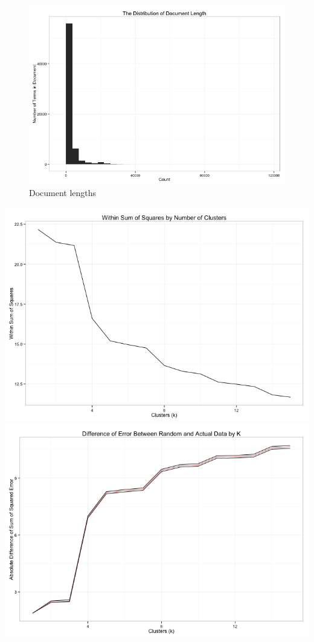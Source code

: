 \documentclass[11pt,article,oneside]{memoir}
\makeatletter
\def\maxwidth{\ifdim\Gin@nat@width>\linewidth\linewidth
\else\Gin@nat@width\fi}
\let\Oldincludegraphics\includegraphics
\renewcommand{\includegraphics}[1]{\Oldincludegraphics[width=\maxwidth]{#1}}
\makeatother
\begin{document}
\begin{figure}[htbp]
\centering
\includegraphics{figure/Document-Lengths.png}
\caption{Document lengths}
\end{figure}

\includegraphics{figure/Cluster-Diagnostics1.png}
\includegraphics{figure/Cluster-Diagnostics2.png}
\end{document}
